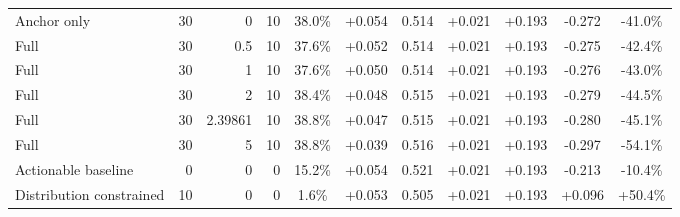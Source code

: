 \begin{table}[htbp]
\begin{tabular}{lrrrccccccc}
Anchor only & 30 & 0 & 10 & 38.0\% & +0.054 & 0.514 & +0.021 & +0.193 & -0.272 & -41.0\% \\
Full & 30 & 0.5 & 10 & 37.6\% & +0.052 & 0.514 & +0.021 & +0.193 & -0.275 & -42.4\% \\
Full & 30 & 1 & 10 & 37.6\% & +0.050 & 0.514 & +0.021 & +0.193 & -0.276 & -43.0\% \\
Full & 30 & 2 & 10 & 38.4\% & +0.048 & 0.515 & +0.021 & +0.193 & -0.279 & -44.5\% \\
Full & 30 & 2.39861 & 10 & 38.8\% & +0.047 & 0.515 & +0.021 & +0.193 & -0.280 & -45.1\% \\
Full & 30 & 5 & 10 & 38.8\% & +0.039 & 0.516 & +0.021 & +0.193 & -0.297 & -54.1\% \\
Actionable baseline & 0 & 0 & 0 & 15.2\% & +0.054 & 0.521 & +0.021 & +0.193 & -0.213 & -10.4\% \\
Distribution constrained & 10 & 0 & 0 & 1.6\% & +0.053 & 0.505 & +0.021 & +0.193 & +0.096 & +50.4\% \\
\bottomrule
\end{tabular}
\end{table}